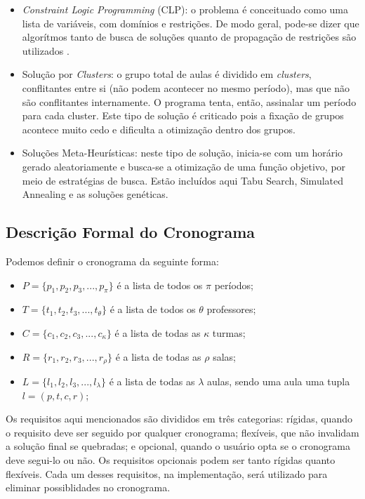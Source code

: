 \documentclass[12pt,a4paper]{article}
\begin{document}
		\begin{itemize}
			\item \textit{Constraint Logic Programming} (CLP): o problema é conceituado como uma lista de variáveis, com domínios e restrições. \cite{badoni} De modo geral, pode-se dizer que algorítmos tanto de busca de soluções quanto de propagação de restrições são utilizados \cite{citar_alguém}.
			\item Solução por \textit{Clusters}: o grupo total de aulas é dividido em \textit{clusters}, conflitantes entre si (não podem acontecer no mesmo período), mas que não são conflitantes internamente. O programa tenta, então, assinalar um período para cada cluster. Este tipo de solução é criticado pois a fixação de grupos acontece muito cedo e dificulta a otimização dentro dos grupos. \cite{muller}
			\item Soluções Meta-Heurísticas: neste tipo de solução, inicia-se com um horário gerado aleatoriamente e busca-se a otimização de uma função objetivo, por meio de estratégias de busca. Estão incluídos aqui Tabu Search, Simulated Annealing e as soluções genéticas.
		\end{itemize}

		\subsection{Descrição Formal do Cronograma}

			\par Podemos definir o cronograma da seguinte forma:

			\begin{itemize}
				\item $P = \{p_1, p_2, p_3, ..., p_\pi\}$ é a lista de todos os $\pi$ períodos;
				\item $T = \{t_1, t_2, t_3, ..., t_\theta\}$ é a lista de todos os $\theta$ professores;
				\item $C = \{c_1, c_2, c_3, ..., c_\kappa\} $ é a lista de todas as $\kappa$ turmas;
				\item $R = \{r_1, r_2, r_3, ..., r_\rho\}$ é a lista de todas as $\rho$ salas;
				\item $L = \{l_1, l_2, l_3, ..., l_\lambda\}$ é a lista de todas as $\lambda$ aulas, sendo uma aula uma tupla $l = (p,t,c,r)$;
			\end{itemize}

			\par Os requisitos aqui mencionados são divididos em três categorias: rígidas, quando o requisito deve ser seguido por qualquer cronograma; flexíveis, que não invalidam a solução final se quebradas; e opcional, quando o usuário opta se o cronograma deve segui-lo ou não. Os requisitos opcionais podem ser tanto rígidas quanto flexíveis. Cada um desses requisitos, na implementação, será utilizado para eliminar possiblidades no cronograma.
\end{document}
